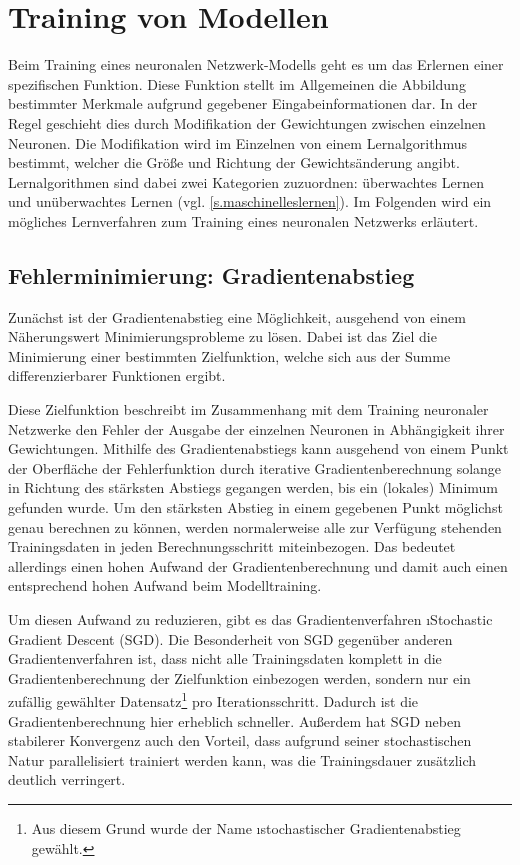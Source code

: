 
\section{Training von Modellen}\label{s.training}
Beim Training eines neuronalen Netzwerk-Modells geht es um das Erlernen einer spezifischen Funktion. Diese Funktion stellt im Allgemeinen die Abbildung bestimmter Merkmale aufgrund gegebener Eingabeinformationen dar. In der Regel geschieht dies durch Modifikation der Gewichtungen zwischen einzelnen Neuronen. Die Modifikation wird im Einzelnen von einem Lernalgorithmus bestimmt, welcher die Größe und Richtung der Gewichtsänderung angibt. Lernalgorithmen sind dabei zwei Kategorien zuzuordnen: überwachtes Lernen und unüberwachtes Lernen (vgl. \autoref{s.maschinelleslernen}). Im Folgenden wird ein mögliches Lernverfahren zum Training eines neuronalen Netzwerks erläutert.

\subsection{Fehlerminimierung: Gradientenabstieg}\label{ss.sgd}
Zunächst ist der Gradientenabstieg eine Möglichkeit, ausgehend von einem Näherungswert Minimierungsprobleme zu lösen. Dabei ist das Ziel die Minimierung einer bestimmten Zielfunktion, welche sich aus der Summe differenzierbarer Funktionen ergibt.

Diese Zielfunktion beschreibt im Zusammenhang mit dem Training neuronaler Netzwerke den Fehler der Ausgabe der einzelnen Neuronen in Abhängigkeit ihrer Gewichtungen. Mithilfe des Gradientenabstiegs kann ausgehend von einem Punkt der Oberfläche der Fehlerfunktion durch iterative Gradientenberechnung solange in Richtung des stärksten Abstiegs gegangen werden, bis ein (lokales) Minimum gefunden wurde. Um den stärksten Abstieg in einem gegebenen Punkt möglichst genau berechnen zu können, werden normalerweise alle zur Verfügung stehenden Trainingsdaten in jeden Berechnungsschritt miteinbezogen. Das bedeutet allerdings einen hohen Aufwand der Gradientenberechnung und damit auch einen entsprechend hohen Aufwand beim Modelltraining.

Um diesen Aufwand zu reduzieren, gibt es das Gradientenverfahren \i{Stochastic Gradient Descent} (SGD). Die Besonderheit von SGD gegenüber anderen Gradientenverfahren ist, dass nicht alle Trainingsdaten komplett in die Gradientenberechnung der Zielfunktion einbezogen werden, sondern nur ein zufällig gewählter Datensatz\footnote{Aus diesem Grund wurde der Name \i{stochastischer} Gradientenabstieg gewählt.} pro Iterationsschritt. Dadurch ist die Gradientenberechnung hier erheblich schneller. Außerdem hat SGD neben stabilerer Konvergenz auch den Vorteil, dass aufgrund seiner stochastischen Natur parallelisiert trainiert werden kann, was die Trainingsdauer zusätzlich deutlich verringert.

